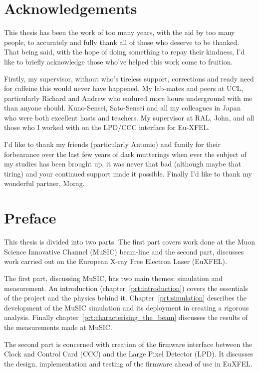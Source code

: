 \chapter*{Acknowledgements} %
\label{cha:acknowledgements}

This thesis has been the work of too many years, with the aid by too many people, to accurately and fully thank all of those who deserve to be thanked. That being said, with the hope of doing something to repay their kindness, I'd like to briefly acknowledge those who've helped this work come to fruition.

Firstly, my supervisor, without who's tireless support, corrections and ready need for caffeine this would never have happened. My lab-mates and peers at UCL, particularly Richard and Andrew who endured more hours underground with me than anyone should. Kuno-Sensei, Sato-Sensei and all my colleagues in Japan who were both excellent hosts and teachers. My supervisor at RAL, John, and all those who I worked with on the LPD/CCC interface for Eu-XFEL.

I'd like to thank my friends (particularly Antonio) and family for their forbearance over the last few years of dark mutterings when ever the subject of my studies has been brought up, it was never that bad (although maybe that tiring) and your continued support made it possible. Finally I'd like to thank my wonderful partner, Morag.

\chapter*{Preface} %
\label{cha:preface}
This thesis is divided into two parts. The first part covers work done at the Muon Science Innovative Channel (MuSIC) beam-line and the second part, discusses work carried out on the European X-ray Free Electron Laser (EuXFEL).

The first part, discussing MuSIC, has two main themes: simulation and measurement. An introduction (chapter~\ref{prt:introduction}) covers the essentials of the project and the physics behind it. Chapter~\ref{prt:simulation} describes the development of the MuSIC simulation  and its deployment in creating a rigorous analysis. Finally chapter~\ref{prt:characterising_the_beam} discusses the results of the measurements made at MuSIC.

The second part is concerned with creation of the firmware interface between the Clock and Control Card (CCC) and the Large Pixel Detector (LPD). It discusses the design, implementation and testing of the firmware ahead of use in EuXFEL.

